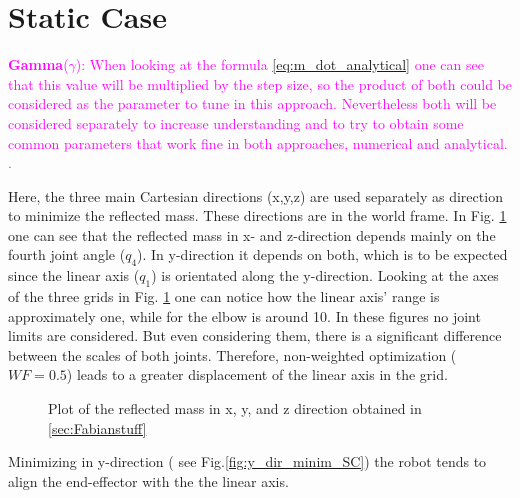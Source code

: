 \section{Static Case} 
\label{sec:static_case}




\textcolor{magenta}{
\textbf{Gamma}($\gamma$):  When looking at the formula  \ref{eq:m_dot_analytical} one can see that this value will be multiplied by the step size, so the product of both could be considered as the parameter to tune in this approach. Nevertheless both will be considered separately to increase understanding and to try to obtain some common parameters that work fine in both approaches, numerical and analytical. \\
.}

Here, the three main Cartesian directions (x,y,z) are used separately as direction to minimize the reflected mass. These directions are in the world frame. In Fig. \ref{fig:reflected_mass_cart_directions}  one can see that the reflected mass in x- and z-direction depends mainly on the fourth joint angle ($q_4$). In y-direction it depends on both, which is to be expected since the linear axis ($q_1$) is orientated along the y-direction. Looking at the axes of the three grids in Fig. \ref{fig:reflected_mass_cart_directions} one can notice how the linear axis' range is approximately one, while for the elbow is around 10. In these figures no joint limits are considered. But even considering them, there is a significant difference between the scales of both joints. Therefore, non-weighted  optimization ($WF = 0.5$) leads to a greater displacement of the linear axis in the grid.
%
\begin{figure}[htp!]
	\centering	
	 	 	
	\caption{Plot of the reflected mass in x, y, and z direction obtained in \ref{sec:Fabianstuff}}
	\label{fig:reflected_mass_cart_directions}
\end{figure}
%
%
Minimizing in y-direction ( see Fig.\ref{fig:y_dir_minim_SC}) the robot tends to align the end-effector with the the linear axis.
